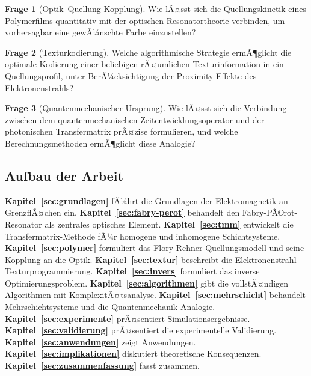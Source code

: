 ﻿\documentclass[a4paper,12pt]{article}
\theoremstyle{definition}
\newtheorem{frage}{Frage}[section]
\begin{document}
	\begin{frage}[Optik--Quellung-Kopplung]
		Wie lÃ¤sst sich die Quellungskinetik eines Polymerfilms quantitativ mit der
		optischen Resonatortheorie verbinden, um vorhersagbar eine gewÃ¼nschte Farbe
		einzustellen?
	\end{frage}
	
	\begin{frage}[Texturkodierung]
		Welche algorithmische Strategie ermÃ¶glicht die optimale Kodierung einer
		beliebigen rÃ¤umlichen Texturinformation in ein Quellungsprofil, unter
		BerÃ¼cksichtigung der Proximity-Effekte des Elektronenstrahls?
	\end{frage}
	
	\begin{frage}[Quantenmechanischer Ursprung]
		Wie lÃ¤sst sich die Verbindung zwischen dem quantenmechanischen
		Zeitentwicklungsoperator und der photonischen Transfermatrix prÃ¤zise
		formulieren, und welche Berechnungsmethoden ermÃ¶glicht diese Analogie?
	\end{frage}
	
	\subsection{Aufbau der Arbeit}
	
	\textbf{Kapitel~\ref{sec:grundlagen}} fÃ¼hrt die Grundlagen der Elektromagnetik
	an GrenzflÃ¤chen ein.
	\textbf{Kapitel~\ref{sec:fabry-perot}} behandelt den Fabry-PÃ©rot-Resonator
	als zentrales optisches Element.
	\textbf{Kapitel~\ref{sec:tmm}} entwickelt die Transfermatrix-Methode fÃ¼r
	homogene und inhomogene Schichtsysteme.
	\textbf{Kapitel~\ref{sec:polymer}} formuliert das Flory-Rehner-Quellungsmodell
	und seine Kopplung an die Optik.
	\textbf{Kapitel~\ref{sec:textur}} beschreibt die Elektronenstrahl-Texturprogrammierung.
	\textbf{Kapitel~\ref{sec:invers}} formuliert das inverse Optimierungsproblem.
	\textbf{Kapitel~\ref{sec:algorithmen}} gibt die vollstÃ¤ndigen Algorithmen
	mit KomplexitÃ¤tsanalyse.
	\textbf{Kapitel~\ref{sec:mehrschicht}} behandelt Mehrschichtsysteme und die
	Quantenmechanik-Analogie.
	\textbf{Kapitel~\ref{sec:experimente}} prÃ¤sentiert Simulationsergebnisse.
	\textbf{Kapitel~\ref{sec:validierung}} prÃ¤sentiert die experimentelle Validierung.
	\textbf{Kapitel~\ref{sec:anwendungen}} zeigt Anwendungen.
	\textbf{Kapitel~\ref{sec:implikationen}} diskutiert theoretische Konsequenzen.
	\textbf{Kapitel~\ref{sec:zusammenfassung}} fasst zusammen.
	
\end{document}
